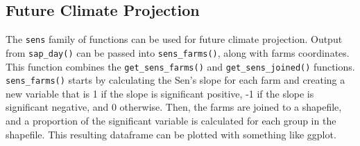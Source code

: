 \documentclass[
]{article}
\newenvironment{Shaded}{}{}
\newcommand{\AttributeTok}[1]{\textcolor[rgb]{0.49,0.56,0.16}{#1}}
\newcommand{\CommentTok}[1]{\textcolor[rgb]{0.38,0.63,0.69}{\textit{#1}}}
\newcommand{\DecValTok}[1]{\textcolor[rgb]{0.25,0.63,0.44}{#1}}
\newcommand{\FunctionTok}[1]{\textcolor[rgb]{0.02,0.16,0.49}{#1}}
\newcommand{\NormalTok}[1]{#1}
\newcommand{\OtherTok}[1]{\textcolor[rgb]{0.00,0.44,0.13}{#1}}
\newcommand{\SpecialCharTok}[1]{\textcolor[rgb]{0.25,0.44,0.63}{#1}}
\newcommand{\StringTok}[1]{\textcolor[rgb]{0.25,0.44,0.63}{#1}}
\begin{document}
\begin{Shaded}
\end{Shaded}

\subsection{Future Climate Projection}\label{future-climate-projection}

The \texttt{sens} family of functions can be used for future climate
projection. Output from \texttt{sap\_day()} can be passed into
\texttt{sens\_farms()}, along with farms coordinates. This function
combines the \texttt{get\_sens\_farms()} and
\texttt{get\_sens\_joined()} functions. \texttt{sens\_farms()} starts by
calculating the Sen's slope for each farm and creating a new variable
that is 1 if the slope is significant positive, -1 if the slope is
significant negative, and 0 otherwise. Then, the farms are joined to a
shapefile, and a proportion of the significant variable is calculated
for each group in the shapefile. This resulting dataframe can be plotted
with something like ggplot.
\end{document}
